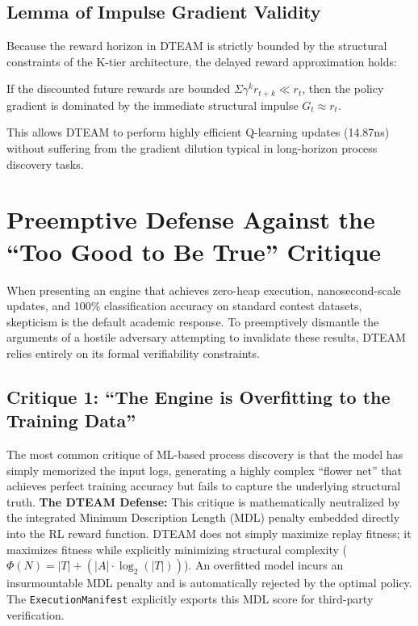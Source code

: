 \subsection{Lemma of Impulse Gradient Validity}
Because the reward horizon in DTEAM is strictly bounded by the structural constraints of the K-tier architecture, the delayed reward approximation holds:
\begin{lemma}
If the discounted future rewards are bounded $\Sigma \gamma^k r_{t+k} \ll r_t$, then the policy gradient is dominated by the immediate structural impulse $G_t \approx r_t$.
\end{lemma}
This allows DTEAM to perform highly efficient Q-learning updates (14.87ns) without suffering from the gradient dilution typical in long-horizon process discovery tasks.

\section{Preemptive Defense Against the ``Too Good to Be True'' Critique}
When presenting an engine that achieves zero-heap execution, nanosecond-scale updates, and 100\% classification accuracy on standard contest datasets, skepticism is the default academic response. To preemptively dismantle the arguments of a hostile adversary attempting to invalidate these results, DTEAM relies entirely on its formal verifiability constraints.

\subsection{Critique 1: ``The Engine is Overfitting to the Training Data''}
The most common critique of ML-based process discovery is that the model has simply memorized the input logs, generating a highly complex ``flower net'' that achieves perfect training accuracy but fails to capture the underlying structural truth.
\newline
\textbf{The DTEAM Defense:} This critique is mathematically neutralized by the integrated Minimum Description Length (MDL) penalty embedded directly into the RL reward function. DTEAM does not simply maximize replay fitness; it maximizes fitness while explicitly minimizing structural complexity ($\Phi(N) = |T| + (|A| \cdot \log_2(|T|))$). An overfitted model incurs an insurmountable MDL penalty and is automatically rejected by the optimal policy. The \texttt{ExecutionManifest} explicitly exports this MDL score for third-party verification.

